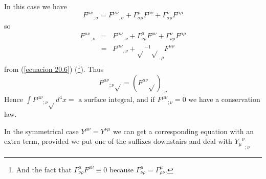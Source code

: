 In this case we have
\[
 {F^{\mu\nu}}_{;\sigma} = {F^{\mu\nu}}_{,\sigma} +
 \Gamma^{\mu}_{\sigma\rho} F^{\rho\nu} +
 \Gamma^{\nu}_{\sigma\rho} F^{\mu\rho}
\]
so
\[
 \begin{array}{rcl}
  {F^{\mu\nu}}_{;\nu} & = & {F^{\mu\nu}}_{,\nu} +
 \Gamma^{\mu}_{\nu\rho} F^{\rho\nu} +
 \Gamma^{\nu}_{\nu\rho} F^{\mu\rho} \\
 & = & {F^{\mu\nu}}_{,\nu} + \sqrt{}^{-1} \sqrt{}_{,\rho} F^{\mu\rho}
 \end{array}
\]
from (\ref{ecuacion 20.6}) (\footnote{And the fact that $\Gamma^{\mu}_{\nu\rho} F^{\rho\nu} \equiv 0$ because 
$\Gamma^{\mu}_{\nu\rho} = \Gamma^{\mu}_{\rho\nu}$.}). Thus 
\begin{equation}
 \label{ecuacion 21.3}
 {F^{\mu\nu}}_{;\nu} \sqrt{} = \left( {F^{\mu\nu} \sqrt{}} \right)_{,\nu} 
\end{equation}
Hence $\int{{F^{\mu\nu}}_{;\nu} \sqrt{}d^4x} = \mbox{ a surface integral}$, and if ${F^{\mu\nu}}_{;\nu} = 0$ we have a 
conservation law.

In the symmetrical case $Y^{\mu\nu} = Y^{\nu\mu}$ we can get a corresponding equation with an extra term, provided we 
put one of the suffixes downstairs and deal with ${{Y_\mu}^\nu}_{;\nu}$
